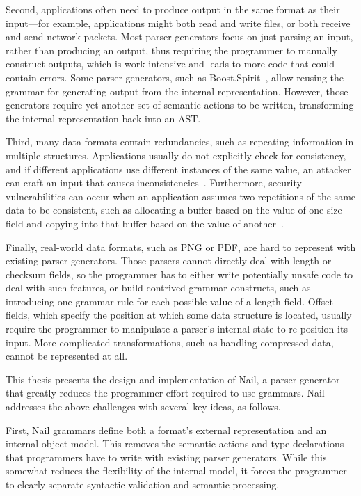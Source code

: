 Second,  applications often need to produce output in the same
format as their input---for example, applications might both
read and write files, or both receive and send network packets.
Most parser generators focus on just parsing an input, rather
than producing an output, thus requiring the programmer to manually
construct outputs, which is work-intensive and leads to
more code that could contain errors.
Some parser generators, such as
Boost.Spirit~\cite{boost-spirit},
allow reusing the grammar for generating output from the internal
representation.  However, those generators require yet another set of
semantic actions to be written, transforming the internal representation
back into an AST\@.

Third, many data formats contain redundancies, such as repeating
information in multiple structures.  Applications usually do not
explicitly check for consistency, and if different applications use
different instances of the same value, an attacker can craft an input that
causes inconsistencies~\cite{evaders6}.  Furthermore, security
vulnerabilities can occur when an application assumes two repetitions
of the same data to be consistent, such as allocating a buffer based on
the value of one size field and copying into that buffer based on the
value of another~\cite{python-bug:20078}.

Finally, real-world data formats, such as PNG or PDF, are hard to
represent with existing parser generators.  Those parsers cannot directly
deal with length or checksum fields, so the programmer has to
either write potentially unsafe code to deal with such features, or build
contrived grammar constructs, such as introducing one grammar rule for
each possible value of a length field.  Offset fields, which specify
the position at which some data structure is located, usually require
the programmer to manipulate a parser's internal state to re-position
its input.  More complicated transformations, such as handling compressed
data, cannot be represented at all.



This thesis presents the design and implementation of Nail, a parser generator that greatly reduces
the programmer effort required to use grammars. Nail addresses the above challenges with
several key ideas, as follows.

First, Nail grammars define both a format's external representation and an internal object model.
This removes the semantic actions and type declarations that programmers have to write with existing
parser generators. While this somewhat reduces the flexibility of the internal model, it forces the programmer
to clearly separate syntactic validation and semantic processing.

